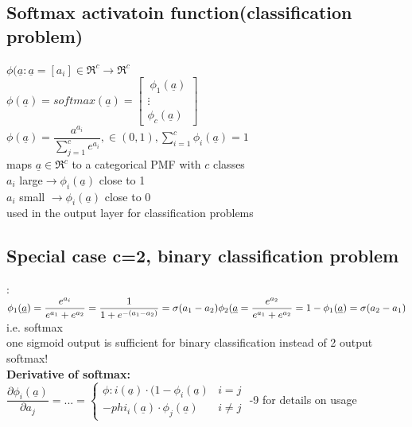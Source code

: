 \subsection{Softmax activatoin function(classification problem)}
$  \phi (\underline{a} : \underline{a}  = [a_i ] \in \Re^c \rightarrow \Re^c$ \\
$  \phi ( \underline{a}) = softmax (\underline{a}) = \left[
\begin{matrix} 
\  \phi_1 (\underline{a}) \\
\vdots \\
\phi_c (\underline{a})
\end{matrix} \right] $ \\
$ \phi (\underline{a}) = \dfrac{ a^{a_i}}{\sum_{j=1}^{c} e^{a_i }} , \in (0,1) , \sum_{i=1}^{c} \phi_i (\underline{a}) = 1 $ \\
\textbullet maps $  \underline{a} \in \Re^c  $ to a categorical PMF with $ c $ classes  \\
\textbullet $  a_i  $ large$  \rightarrow \phi_i (\underline{a} )  $ close to 1 \\
\textbullet $  a_i  $ small $ \rightarrow \phi_i (\underline{a} )  $ close to 0 \\
\textbullet used in the output layer for classification problems \\
\subsection{Special case c=2, binary classification problem}:
$ \phi_1 (\underline{a}) = \dfrac{e^{a_i}}{e^{a_1} + e^{a_2}} = \dfrac{1}{1+ e^{-(a_1 - a_2)}} = \sigma (a_1 - a _ 2) \\
\phi_2 (\underline{a} = \dfrac{e^{a_2}}{e^{a_1} + e^{a_2}} = 1 - \phi_1 (\underline{a}) = \sigma (a_2 - a_1) \\
$
i.e. softmax \\
one sigmoid output is sufficient for binary classification instead of 2 output softmax! \\
\textbf{  Derivative of softmax:}\\
$ \dfrac{ \partial \phi_i (\underline{a}) }{\partial a_j} = ... = \left\lbrace \begin{array}{lc}
\phi:i (\underline{a})\cdot ( 1- \phi_i (\underline{a}) & i=j \\
- phi_i (\underline{a}) \cdot \phi_j (\underline{a}) & i \neq j 
\end{array} \right. $
-9 for details on usage \\
